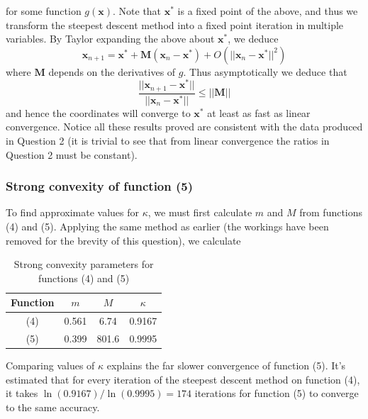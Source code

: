 \documentclass[10pt,a4paper,notitlepage]{article}
\newcommand{\abs}[1]{\lvert#1\rvert}
\newcommand{\x}{\mathbf{x}}
\newcommand{\M}{\mathbf{M}}
\begin{document}
for some function $g(\x)$. Note that $\x^{*}$ is a fixed point of the above, and thus we transform the steepest descent method into a fixed point iteration in multiple variables. By Taylor expanding the above about $\x^{*}$, we deduce 
\begin{equation}
\x_{n+1}=\x^{*}+\M\left(\x_{n}-\x^{*}\right)+O(\abs{\abs{\x_{n}-\x^{*}}}^{2})
\end{equation}
where $\M$ depends on the derivatives of $g$. Thus asymptotically we deduce that
\begin{equation}
\frac{\abs{\abs{\x_{n+1}-\x^{*}}}}{\abs{\abs{\x_{n}-\x^{*}}}}\leq \abs{\abs{\M}}
\end{equation}
and hence the coordinates will converge to $\x^{*}$ at least as fast as linear convergence. Notice all these results proved are consistent with the data produced in Question 2 (it is trivial to see that from linear convergence the ratios in Question 2 must be constant).
\subsubsection*{\centering Strong convexity of function (5)}
To find approximate values for $\kappa$, we must first calculate $m$ and $M$ from functions (4) and (5). Applying the same method as earlier (the workings have been removed for the brevity of this question), we calculate
\begin{table}[H]
\centering 
\begin{tabular}{|c|ccc|}
\hline Function & $m$ & $M$ & $\kappa$\\
\hline
(4) & 0.561 & 6.74 & 0.9167\\
(5) & 0.399 & 801.6 & 0.9995\\
\hline
\end{tabular}
\caption{Strong convexity parameters for functions (4) and (5)}
\end{table}

Comparing values of $\kappa$ explains the far slower convergence of function (5). It's estimated that for every iteration of the steepest descent method on function (4), it takes $\ln(0.9167)/\ln(0.9995)=174$ iterations for function (5) to converge to the same accuracy.\\
\end{document}
